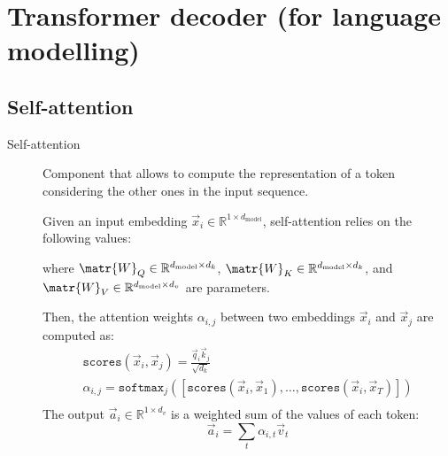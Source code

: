 \section{Transformer decoder (for language modelling)}


\subsection{Self-attention}

\begin{description}
    \item[Self-attention] 
        Component that allows to compute the representation of a token considering the other ones in the input sequence. 

        Given an input embedding $\vec{x}_i \in \mathbb{R}^{1 \times d_\text{model}}$, self-attention relies on the following values:
        where $\matr{W}_Q \in \mathbb{R}^{d_\text{model} \times d_k}$, $\matr{W}_K \in \mathbb{R}^{d_\text{model} \times d_k}$, and $\matr{W}_V \in \mathbb{R}^{d_\text{model} \times d_v}$ are parameters.

        Then, the attention weights $\alpha_{i,j}$ between two embeddings $\vec{x}_i$ and $\vec{x}_j$ are computed as:
        \[
            \begin{gathered}
                \texttt{scores}(\vec{x}_i, \vec{x}_j) = \frac{\vec{q}_i \vec{k}_j}{\sqrt{d_k}} \\
                \alpha_{i,j} = \texttt{softmax}_j\left( \left[\texttt{scores}(\vec{x}_i, \vec{x}_1), \dots, \texttt{scores}(\vec{x}_i, \vec{x}_T)\right] \right) \\
            \end{gathered}
        \]
        The output $\vec{a}_i \in \mathbb{R}^{1 \times d_v}$ is a weighted sum of the values of each token:
        \[ \vec{a}_i = \sum_{t} \alpha_{i,t} \vec{v}_t \]


\end{description}

